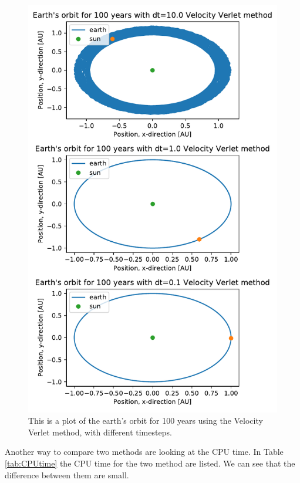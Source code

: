 \begin{figure}[H]
\includegraphics[width=1.1\linewidth]{../results/plots/different_timesteps_Velocity Verlet method.pdf}\caption{This is a plot of the earth's orbit for 100 years using the Velocity Verlet method, with different timesteps.}\label{fig:timesteps-verlet}
\end{figure}		

Another way to compare two methods are looking at the CPU time. In Table \ref{tab:CPUtime} the CPU time for the two method are listed. We can see that the difference between them are small.


